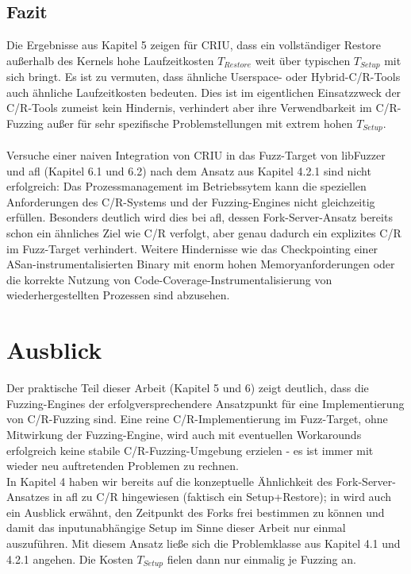 \documentclass[a4paper]{article}
\begin{document}
\subsection{Fazit}
Die Ergebnisse aus Kapitel 5 zeigen für CRIU, dass ein vollständiger Restore außerhalb des Kernels hohe Laufzeitkosten $T_{Restore}$ weit über typischen $T_{Setup}$ mit sich bringt.
Es ist zu vermuten, dass ähnliche Userspace- oder Hybrid-C/R-Tools auch ähnliche Laufzeitkosten bedeuten.
Dies ist im eigentlichen Einsatzzweck der C/R-Tools zumeist kein Hindernis, verhindert aber ihre Verwendbarkeit im C/R-Fuzzing außer für sehr spezifische Problemstellungen mit extrem hohen $T_{Setup}$.\\ \\
Versuche einer naiven Integration von CRIU in das Fuzz-Target von libFuzzer und afl (Kapitel 6.1 und 6.2) nach dem Ansatz aus Kapitel 4.2.1 sind nicht erfolgreich: Das Prozessmanagement im Betriebssytem kann die speziellen Anforderungen des C/R-Systems und der Fuzzing-Engines nicht gleichzeitig erfüllen.
Besonders deutlich wird dies bei afl, dessen Fork-Server-Ansatz bereits schon ein ähnliches Ziel wie C/R verfolgt, aber genau dadurch ein explizites C/R im Fuzz-Target verhindert.
Weitere Hindernisse wie das Checkpointing einer ASan-instrumentalisierten Binary mit enorm hohen Memoryanforderungen oder die korrekte Nutzung von Code-Coverage-Instrumentalisierung von wiederhergestellten Prozessen sind abzusehen.\\

\section{Ausblick}
Der praktische Teil dieser Arbeit (Kapitel 5 und 6) zeigt deutlich, dass die Fuzzing-Engines der erfolgversprechendere Ansatzpunkt für eine Implementierung von C/R-Fuzzing sind.
Eine reine C/R-Implementierung im Fuzz-Target, ohne Mitwirkung der Fuzzing-Engine, wird auch mit eventuellen Workarounds erfolgreich keine stabile C/R-Fuzzing-Umgebung erzielen - es ist immer mit wieder neu auftretenden Problemen zu rechnen.\\
In Kapitel 4 haben wir bereits auf die konzeptuelle Ähnlichkeit des Fork-Server-Ansatzes in afl zu C/R hingewiesen (faktisch ein Setup+Restore); in \cite{aflrestore} wird auch ein Ausblick erwähnt, den Zeitpunkt des Forks frei bestimmen zu können und damit das inputunabhängige Setup im Sinne dieser Arbeit nur einmal auszuführen.
Mit diesem Ansatz ließe sich die Problemklasse aus Kapitel 4.1 und 4.2.1 angehen.
Die Kosten $T_{Setup}$ fielen dann nur einmalig je Fuzzing an.\\
\end{document}
